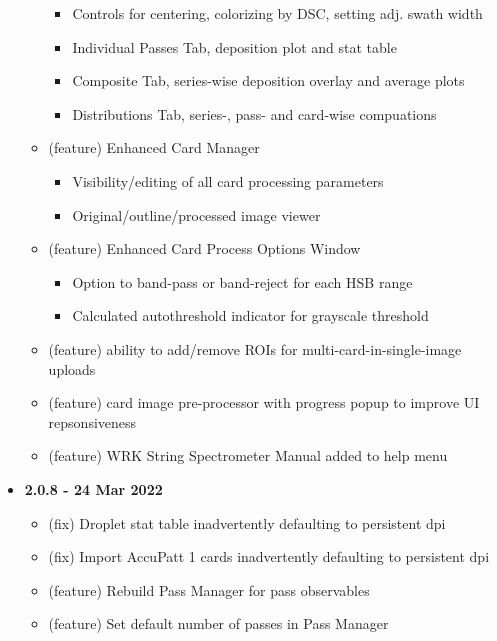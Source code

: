 \documentclass[10pt,letterpaper,titlepage]{article}
\begin{document}
\begin{itemize}
\begin{itemize}
            \begin{itemize}
                \item Controls for centering, colorizing by DSC, setting adj. swath width
                \item Individual Passes Tab, deposition plot and stat table
                \item Composite Tab, series-wise deposition overlay and average plots
                \item Distributions Tab, series-, pass- and card-wise compuations
            \end{itemize}
            \item (feature) Enhanced Card Manager
            \begin{itemize}
                \item Visibility/editing of all card processing parameters
                \item Original/outline/processed image viewer
            \end{itemize}
            \item (feature) Enhanced Card Process Options Window
            \begin{itemize}
                \item Option to band-pass or band-reject for each HSB range
                \item Calculated autothreshold indicator for grayscale threshold
            \end{itemize}
            \item (feature) ability to add/remove ROIs for multi-card-in-single-image uploads
            \item (feature) card image pre-processor with progress popup to improve UI repsonsiveness
            \item (feature) WRK String Spectrometer Manual added to help menu
        \end{itemize}
        \item \textbf{2.0.8 - 24 Mar 2022}
        \begin{itemize}
            \item (fix) Droplet stat table inadvertently defaulting to persistent dpi
            \item (fix) Import AccuPatt 1 cards inadvertently defaulting to persistent dpi
            \item (feature) Rebuild Pass Manager for pass observables
            \item (feature) Set default number of passes in Pass Manager

\end{itemize}
\end{itemize}
\end{document}

